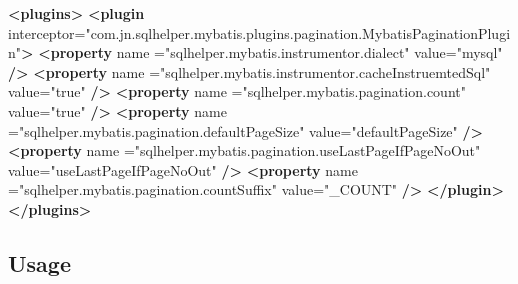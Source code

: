 \documentclass[
]{book}
\newenvironment{Shaded}{\begin{snugshade}}{\end{snugshade}}
\newcommand{\KeywordTok}[1]{\textcolor[rgb]{0.13,0.29,0.53}{\textbf{#1}}}
\newcommand{\OtherTok}[1]{\textcolor[rgb]{0.56,0.35,0.01}{#1}}
\newcommand{\StringTok}[1]{\textcolor[rgb]{0.31,0.60,0.02}{#1}}
\begin{document}
\begin{enumerate}
\begin{Shaded}
\begin{Highlighting}[]
\KeywordTok{<plugins>}
    \KeywordTok{<plugin}\OtherTok{ interceptor=}\StringTok{"com.jn.sqlhelper.mybatis.plugins.pagination.MybatisPaginationPlugin"}\KeywordTok{>}
        \KeywordTok{<property}\OtherTok{ name} \OtherTok{=}\StringTok{"sqlhelper.mybatis.instrumentor.dialect"}\OtherTok{ value=}\StringTok{"mysql"} \KeywordTok{/>}
        \KeywordTok{<property}\OtherTok{ name} \OtherTok{=}\StringTok{"sqlhelper.mybatis.instrumentor.cacheInstruemtedSql"}\OtherTok{ value=}\StringTok{"true"} \KeywordTok{/>}
        \KeywordTok{<property}\OtherTok{ name} \OtherTok{=}\StringTok{"sqlhelper.mybatis.pagination.count"}\OtherTok{ value=}\StringTok{"true"} \KeywordTok{/>}
        \KeywordTok{<property}\OtherTok{ name} \OtherTok{=}\StringTok{"sqlhelper.mybatis.pagination.defaultPageSize"}\OtherTok{ value=}\StringTok{"defaultPageSize"} \KeywordTok{/>}
        \KeywordTok{<property}\OtherTok{ name} \OtherTok{=}\StringTok{"sqlhelper.mybatis.pagination.useLastPageIfPageNoOut"}\OtherTok{ value=}\StringTok{"useLastPageIfPageNoOut"} \KeywordTok{/>}
        \KeywordTok{<property}\OtherTok{ name} \OtherTok{=}\StringTok{"sqlhelper.mybatis.pagination.countSuffix"}\OtherTok{ value=}\StringTok{"_COUNT"} \KeywordTok{/>}
    \KeywordTok{</plugin>}
\KeywordTok{</plugins>}
\end{Highlighting}
\end{Shaded}

  \hypertarget{pagination_mybatis_usage}{%
  \subsection{Usage}\label{pagination_mybatis_usage}}
\end{enumerate}
\end{document}
